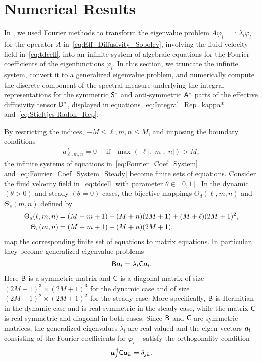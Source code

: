 \documentclass[amsa]{ipart}
\begin{document}
\section{Numerical Results}\label{sec:Num_Results}
%
In , we used Fourier methods to transform
the eigenvalue problem $A\varphi_l=\imath\lambda_l\varphi_l$ for the operator $A$
in~\eqref{eq:Eff_Diffusivity_Sobolev}, involving the fluid velocity field
in~\eqref{eq:tdcell}, into an infinite system of 
algebraic equations for the Fourier coefficients of the eigenfunctions
$\varphi_l$. In this section, we truncate the infinite
system, convert it to a generalized eigenvalue problem, and
numerically compute the discrete component of the spectral measure
underlying the integral representations for the symmetric
$\mathsf{S}^*$ and anti-symmetric $\mathsf{A}^*$ parts of the effective diffusivity
tensor $\mathsf{D}^*$, displayed in equations~\eqref{eq:Integral_Rep_kappa*}
and~\eqref{eq:Stieltjes-Radon_Rep}. 




By restricting the indices, $-M\leq \ell,m,n\leq M$, and imposing the boundary
conditions
%
\begin{align}
  a^{\,l}_{\ell,m,n}=0 \quad \text{ if } \ \ \max(|\ell|,|m|,|n|)>M,
\end{align}
%
the infinite
systems of equations in~\eqref{eq:Fourier_Coef_System}
and~\eqref{eq:Fourier_Coef_System_Steady} become finite sets of
equations. Consider the fluid velocity field in~\eqref{eq:tdcell} with
parameter $\theta\in[0,1]$. In the dynamic $(\theta>0)$ and steady $(\theta=0)$ cases,
the bijective mappings $\Theta_d(\ell,m,n)$ and $\Theta_s(m,n)$ defined by
%
\begin{align}\label{eq:Bijections}
  \Theta_d(\ell,m,n)&=(M+m+1)+(M+n)(2M+1)+(M+\ell)(2M+1)^2,
  \\
  \Theta_s(m,n)&=(M+m+1)+(M+n)(2M+1),
  \notag
\end{align}
%
map the corresponding finite set of equations to matrix equations. In
particular, they become generalized eigenvalue problems 
%
\begin{align}\label{eq:Matrix_Equation}
  \Bm\veca_l=\lambda_l \Cm\veca_l.
\end{align}
%
Here $\mathsf{B}$ is a symmetric matrix and $\mathsf{C}$ is a diagonal matrix of size
$(2M+1)^3\times(2M+1)^3$ for the dynamic case and of size
$(2M+1)^2\times(2M+1)^2$ for the steady case. More specifically, $\mathsf{B}$ is
Hermitian in the dynamic case and is real-symmetric in the steady
case, while the matrix $\mathsf{C}$ is real-symmetric and diagonal in both
cases. Since $\mathsf{B}$ and $\mathsf{C}$ are symmetric matrices, the generalized
eigenvalues $\lambda_l$ are real-valued and the eigen-vectors $\boldsymbol{a}_l$ --
consisting of the Fourier coefficients for $\varphi_l$ -- satisfy the
orthogonality condition~\cite{Parlett:1980}  
%
\begin{align}\label{eq:Matrix_Ortho}
  \veca_j^{\,\dagger}\Cm\veca_k=\delta_{jk}.
\end{align}
%
\end{document}
